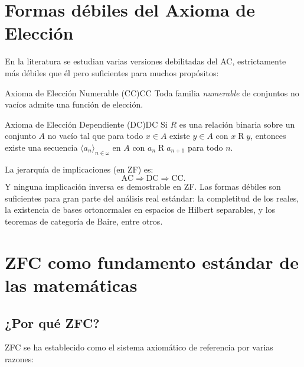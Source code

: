 \section{Formas débiles del Axioma de Elección}

En la literatura se estudian varias versiones debilitadas del AC, estrictamente más débiles que él pero suficientes para muchos propósitos:

\begin{definicion}{Axioma de Elección Numerable (CC)}{CC}
Toda familia \emph{numerable} de conjuntos no vacíos admite una función de elección.
\end{definicion}

\begin{definicion}{Axioma de Elección Dependiente (DC)}{DC}
Si $R$ es una relación binaria sobre un conjunto $A$ no vacío tal que para todo $x \in A$ existe $y \in A$ con $x \mathrel{R} y$, entonces existe una secuencia $\langle a_n \rangle_{n \in \omega}$ en $A$ con $a_n \mathrel{R} a_{n+1}$ para todo $n$.
\end{definicion}

La jerarquía de implicaciones (en ZF) es:
\[
  \mathrm{AC} \Rightarrow \mathrm{DC} \Rightarrow \mathrm{CC}.
\]
Y ninguna implicación inversa es demostrable en ZF. Las formas débiles son suficientes para gran parte del análisis real estándar: la completitud de los reales, la existencia de bases ortonormales en espacios de Hilbert separables, y los teoremas de categoría de Baire, entre otros.

\section{ZFC como fundamento estándar de las matemáticas}

\subsection{¿Por qué ZFC?}

ZFC se ha establecido como el sistema axiomático de referencia por varias razones:

